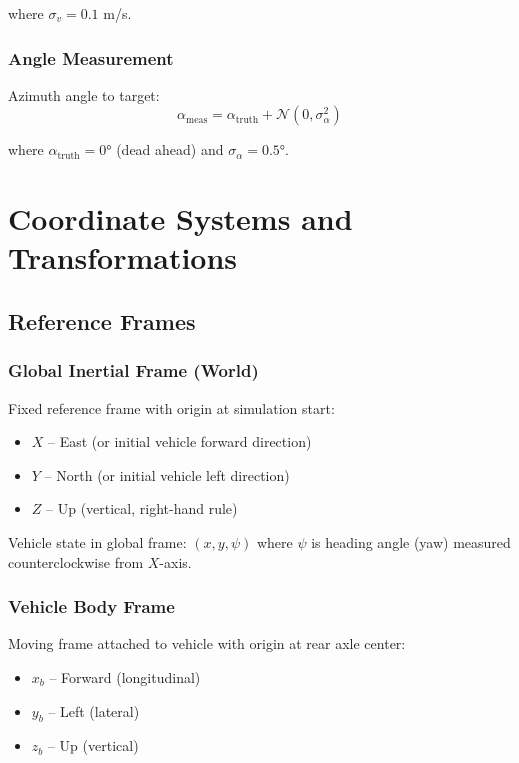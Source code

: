 \documentclass[11pt,a4paper]{article}
\begin{document}
where $\sigma_v = 0.1$ m/s.

\subsubsection{Angle Measurement}

Azimuth angle to target:
\begin{equation}
\alpha_{\text{meas}} = \alpha_{\text{truth}} + \mathcal{N}(0, \sigma_{\alpha}^2)
\end{equation}

where $\alpha_{\text{truth}} = 0°$ (dead ahead) and $\sigma_{\alpha} = 0.5°$.


\section{Coordinate Systems and Transformations}

\subsection{Reference Frames}

\subsubsection{Global Inertial Frame (World)}

Fixed reference frame with origin at simulation start:
\begin{itemize}
    \item $X$ -- East (or initial vehicle forward direction)
    \item $Y$ -- North (or initial vehicle left direction)
    \item $Z$ -- Up (vertical, right-hand rule)
\end{itemize}

Vehicle state in global frame: $(x, y, \psi)$ where $\psi$ is heading angle (yaw) measured counterclockwise from $X$-axis.

\subsubsection{Vehicle Body Frame}

Moving frame attached to vehicle with origin at rear axle center:
\begin{itemize}
    \item $x_b$ -- Forward (longitudinal)
    \item $y_b$ -- Left (lateral)
    \item $z_b$ -- Up (vertical)
\end{itemize}
\end{document}
